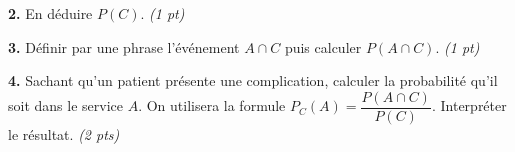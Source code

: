 \documentclass[11pt,a4paper]{article}
\newcommand{\cadreblanc}[1]{%
\medskip\framebox[\linewidth][c]{%
\rule{0mm}{#1mm}}\par
\medskip}
\begin{document}
\vfill 

\textbf{2.} En déduire $P(C)$. \hfill\textit{(1 pt)}

\cadreblanc{14}

\vfill 


\textbf{3.} Définir par une phrase l'événement $A \cap C$ puis calculer $P(A \cap C)$. \hfill\textit{(1 pt)}

\cadreblanc{16}

\vfill 


\textbf{4.} Sachant qu'un patient présente une complication, calculer la probabilité qu'il soit dans le service $A$.
On utilisera la formule $P_C(A)=\dfrac{P(A \cap C)}{P(C)}$.
Interpréter le résultat. \hfill\textit{(2 pts)}

\cadreblanc{24}
\end{document}
